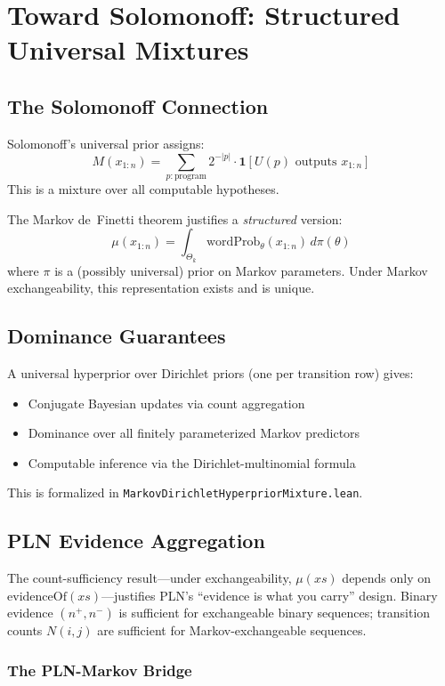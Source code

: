 \documentclass[11pt,a4paper]{article}
\theoremstyle{definition}
\begin{document}
\section{Toward Solomonoff: Structured Universal Mixtures}

\subsection{The Solomonoff Connection}

Solomonoff's universal prior assigns:
\[
M(x_{1:n}) = \sum_{p : \text{program}} 2^{-|p|} \cdot \mathbf{1}[U(p) \text{ outputs } x_{1:n}]
\]
This is a mixture over all computable hypotheses.

The Markov de~Finetti theorem justifies a \emph{structured} version:
\[
\mu(x_{1:n}) = \int_{\Theta_k} \mathrm{wordProb}_\theta(x_{1:n}) \, d\pi(\theta)
\]
where $\pi$ is a (possibly universal) prior on Markov parameters. Under
Markov exchangeability, this representation exists and is unique.

\subsection{Dominance Guarantees}

A universal hyperprior over Dirichlet priors (one per transition row) gives:
\begin{itemize}
\item Conjugate Bayesian updates via count aggregation
\item Dominance over all finitely parameterized Markov predictors
\item Computable inference via the Dirichlet-multinomial formula
\end{itemize}

This is formalized in \texttt{MarkovDirichletHyperpriorMixture.lean}.

\subsection{PLN Evidence Aggregation}

The count-sufficiency result---under exchangeability, $\mu(xs)$ depends only
on $\mathrm{evidenceOf}(xs)$---justifies PLN's ``evidence is what you carry''
design. Binary evidence $(n^+, n^-)$ is sufficient for exchangeable binary
sequences; transition counts $N(i,j)$ are sufficient for Markov-exchangeable
sequences.

\subsubsection{The PLN-Markov Bridge}
\end{document}
